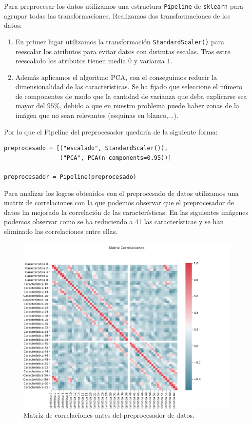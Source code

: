 \documentclass[size=a4, parskip=half, titlepage=false, toc=flat, toc=bib, 12pt]{scrartcl}
\begin{document}
Para preprocesar los datos utilizamos una estructura \verb|Pipeline| de \verb|sklearn| para agrupar todas las transformaciones. Realizamos dos transformaciones de los datos:
\begin{enumerate}
\item En primer lugar utilizamos la transformación \verb|StandardScaler()| para reescalar los atributos para evitar datos con distintas escalas. Tras estre reescalado los atributos tienen media $0$ y varianza $1$.

\item Además aplicamos el algoritmo PCA, con el conseguimos reducir la dimensionalidad de las características. Se ha fijado que seleccione el número de componentes de modo que la cantidad de varianza que deba explicarse sea mayor del $95\%$, debido a que en nuestro problema puede haber zonas de la imágen que no sean relevantes (esquinas en blanco,...).

\end{enumerate}
Por lo que el Pipeline del preprocesador quedaría de la siguiente forma:
\begin{verbatim}
preprocesado = [("escalado", StandardScaler()),
                ("PCA", PCA(n_components=0.95))]

preprocesador = Pipeline(preprocesado)
\end{verbatim}
Para analizar los logros obtenidos con el preprocesado de datos utilizamos una matriz de correlaciones con la que podemos observar que el preprocesador de datos ha mejorado la correlación de las características. En las siguientes imágenes podemos observar como se ha reduciendo a 41 las características y se han eliminado las correlaciones entre ellas.
\begin{figure}[H]
\centering
\includegraphics[width=1\textwidth]{./img/antespre}
\caption{Matriz de correlaciones antes del preprocesador de datos.}
\end{figure}
\end{document}
